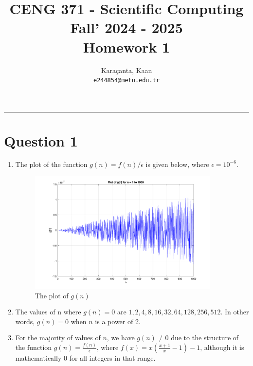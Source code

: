\documentclass[11pt,a4paper, margin=1in]{article}
\author{
  Karaçanta, Kaan\\
  \texttt{e244854@metu.edu.tr}
}
\title{CENG 371 - Scientific Computing \\
Fall' 2024 - 2025 \\
Homework 1}
\begin{document}
\maketitle

\noindent\rule{19cm}{1.2pt}

\section*{Question 1}

\begin{enumerate}
    \item The plot of the function \( g(n) = f(n) / \epsilon \) is given below, where \( \epsilon = 10^{-6} \).
    \begin{figure}[H]
        \centering
        \includegraphics[width=0.9\textwidth]{q1.png}
        \caption{The plot of \(g(n)\)}
    \end{figure}

    \item The values of n where \( g(n) = 0 \) are \( 1, 2, 4, 8, 16, 32, 64, 128, 256, 512 \). In other words, \( g(n) = 0 \) when \(n\) is a power of 2. 
    
    \item For the majority of values of \( n \), we have \( g(n) \neq 0 \) due to the structure of the function \( g(n) = \frac{f(n)}{\epsilon} \), where \( f(x) = x\left(\frac{x+1}{x} - 1\right) - 1 \), although it is mathematically \(0\) for all integers in that range.


\end{enumerate}
\end{document}
